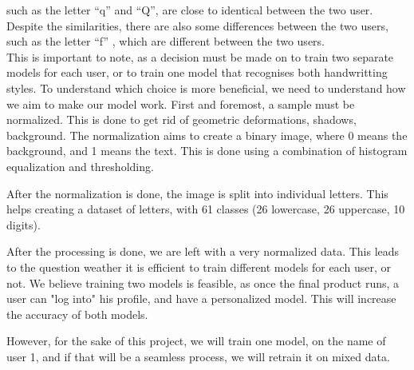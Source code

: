 \documentclass[twoside,a4paper]{article}
\begin{document}
such as the letter ``q'' and ``Q'', are close to identical between the two user. Despite the similarities, there are also some differences between the two users, such as the letter ``f'' , which are different between the two users.
\\
This is important to note, as a decision must be made on to train two separate models for each user, or to train one model that recognises both handwritting styles.
To understand which choice is more beneficial, we need to understand how we aim to make our model work. First and foremost, a sample must be normalized. This is done to get rid of geometric deformations,
shadows, background. The normalization aims to create a binary image, where 0 means the background, and 1 means the text. This is done using a combination of histogram equalization and thresholding.

After the normalization is done, the image is split into individual letters. This helps creating a dataset of letters, with 61 classes (26 lowercase, 26 uppercase, 10 digits).

After the processing is done, we are left with a very normalized data. This leads to the question weather it is efficient to train different models for each user, or not. 
We believe training two models is feasible, as once the final product runs, a user can "log into" his profile, and have a personalized model. This will increase the accuracy of both models.

However, for the sake of this project, we will train one model, on the name of user 1, and if that will be a seamless process, we will retrain it on mixed data. 
\end{document}
